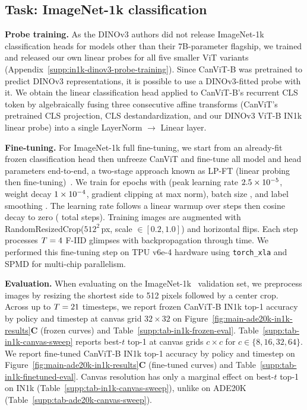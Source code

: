 \documentclass{article}
\begin{document}
\subsection{Task: ImageNet-1k classification}
\label{supp:task-in1k}

\textbf{Probe training.} As the DINOv3 authors did not release ImageNet-1k classification heads for models other than their 7B-parameter flagship, we trained and released our own linear probes for all five smaller ViT variants (Appendix~\ref{supp:in1k-dinov3-probe-training}). Since CanViT-B was pretrained to predict DINOv3 representations, it is possible to use a DINOv3-fitted probe with it. We obtain the linear classification head applied to CanViT-B's recurrent CLS token by algebraically fusing three consecutive affine transforms (CanViT's pretrained CLS projection, CLS destandardization, and our DINOv3 ViT-B IN1k linear probe) into a single LayerNorm $\to$ Linear layer.

\textbf{Fine-tuning.} For ImageNet-1k full fine-tuning, we start from an already-fit frozen classification head then unfreeze CanViT and fine-tune all model and head parameters end-to-end, a two-stage approach known as LP-FT (linear probing then fine-tuning)~\cite{kumarFineTuningCanDistort2022}. We train for \inkFtEpochs{} epochs with \inkFtOptimizer{} (peak learning rate $2.5 \times 10^{-5}$, weight decay $1 \times 10^{-4}$, gradient clipping at \inkFtGradClip{} max norm), batch size \inkFtBatchSize{}, and label smoothing \inkFtLabelSmoothing{}. The learning rate follows a linear warmup over \inkFtWarmupSteps{} steps then cosine decay to zero (\inkFtTotalSteps{} total steps). Training images are augmented with RandomResizedCrop($512^2$\,px, scale $\in [0.2, 1.0]$) and horizontal flips. Each step processes $T = 4$ F-IID glimpses with \inkFtBpttMode{} backpropagation through time. We performed this fine-tuning step on TPU v6e-4 hardware using \texttt{torch\_xla} and SPMD for multi-chip parallelism.

\textbf{Evaluation.} When evaluating on the ImageNet-1k~\cite{russakovskyImageNetLargeScale2015} validation set, we preprocess images by resizing the shortest side to 512 pixels followed by a center crop. Across up to $T = 21$ timesteps, we report frozen CanViT-B IN1k top-1 accuracy by policy and timestep at canvas grid $32 \times 32$ on Figure~\ref{fig:main-ade20k-in1k-results}\textbf{C} (frozen curves) and Table~\ref{supp:tab-in1k-frozen-eval}. Table~\ref{supp:tab-in1k-canvas-sweep} reports best-$t$ top-1 at canvas grids $c \times c$ for $c \in \{8, 16, 32, 64\}$.
We report fine-tuned CanViT-B IN1k top-1 accuracy by policy and timestep on Figure~\ref{fig:main-ade20k-in1k-results}\textbf{C} (fine-tuned curves) and Table~\ref{supp:tab-in1k-finetuned-eval}.
Canvas resolution has only a marginal effect on best-$t$ top-1 on IN1k (Table~\ref{supp:tab-in1k-canvas-sweep}), unlike on ADE20K (Table~\ref{supp:tab-ade20k-canvas-sweep}).
\end{document}
